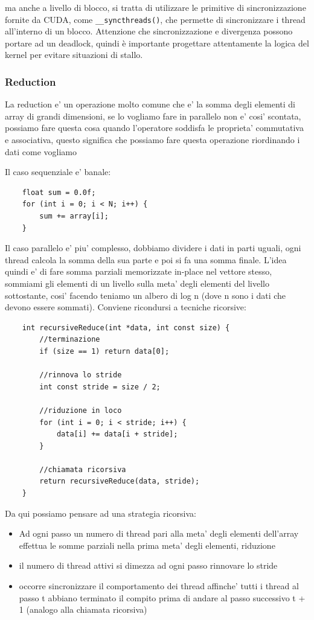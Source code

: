 ma anche a livello di blocco, si tratta di utilizzare le primitive di sincronizzazione fornite da CUDA, come \texttt{\_\_syncthreads()}, che permette di sincronizzare i thread all'interno di un blocco. Attenzione che sincronizzazione e divergenza possono portare ad un deadlock, quindi è importante progettare attentamente la logica del kernel per evitare situazioni di stallo.

\subsubsection{Reduction}
La reduction e' un operazione molto comune che e' la somma degli elementi di array di grandi dimensioni, se lo vogliamo fare in parallelo non e' cosi' scontata, possiamo fare questa cosa quando l'operatore soddisfa le proprieta' commutativa e associativa, questo significa che possiamo fare questa operazione riordinando i dati come vogliamo

Il caso sequenziale e' banale:
\begin{lstlisting}
    float sum = 0.0f;
    for (int i = 0; i < N; i++) {
        sum += array[i];
    }
\end{lstlisting}

Il caso parallelo e' piu' complesso, dobbiamo dividere i dati in parti uguali, ogni thread calcola la somma della sua parte e poi si fa una somma finale. L'idea quindi e' di fare somma parziali memorizzate in-place nel vettore stesso, sommiami gli elementi di un livello sulla meta' degli elementi del livello sottostante, cosi' facendo teniamo un albero di log n (dove n sono i dati che devono essere sommati).
Conviene ricondursi a tecniche ricorsive:
\begin{lstlisting}
    int recursiveReduce(int *data, int const size) {
        //terminazione
        if (size == 1) return data[0];

        //rinnova lo stride
        int const stride = size / 2;

        //riduzione in loco
        for (int i = 0; i < stride; i++) {
            data[i] += data[i + stride];
        }

        //chiamata ricorsiva
        return recursiveReduce(data, stride);
    }
\end{lstlisting}

Da qui possiamo pensare ad una strategia ricorsiva:
\begin{itemize}
    \item Ad ogni passo un numero di thread pari alla meta' degli elementi dell'array effettua le somme parziali nella prima meta' degli elementi, riduzione
    \item il numero di thread attivi si dimezza ad ogni passo rinnovare lo stride
    \item occorre sincronizzare il comportamento dei thread affinche' tutti i thread al passo t abbiano terminato il compito prima di andare al passo successivo t + 1 (analogo alla chiamata ricorsiva)
\end{itemize}

